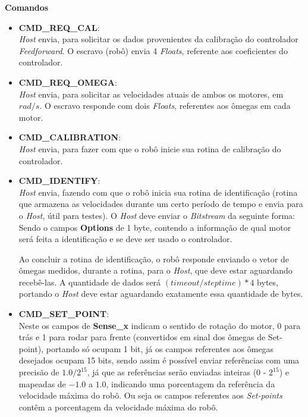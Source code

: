 \textbf{Comandos}
\begin{itemize}
    \item \textbf{CMD\_REQ\_CAL}:\\
        \textit{Host} envia, para solicitar os dados provenientes da calibração do controlador \textit{Feedforward}. O escravo (robô) envia 4 \emph{Floats}, referente aos coeficientes do controlador.
    \item \textbf{CMD\_REQ\_OMEGA}:\\
        \textit{Host} envia, para solicitar as velocidades atuais de ambos os motores, em $rad/s$. O escravo responde com dois \emph{Floats}, referentes aos ômegas em cada motor.
    \item \textbf{CMD\_CALIBRATION}:\\
        \textit{Host} envia, para fazer com que o robô inicie sua rotina de calibração do controlador.
    \item \textbf{CMD\_IDENTIFY}:\\
        \textit{Host} envia, fazendo com que o robô inicia sua rotina de identificação (rotina que armazena as velocidades durante um certo período de tempo e envia para o \emph{Host}, útil para testes). O \textit{Host} deve enviar o \emph{Bitstream} da seguinte forma:\\
        
        
        
        Sendo o campos \textbf{Options} de 1 byte, contendo a informação de qual motor será feita a identificação e se deve ser usado o controlador.
        
        Ao concluir a rotina de identificação, o robô responde enviando o vetor de ômegas medidos, durante a rotina, para o \textit{Host}, que deve estar aguardando recebê-las. A quantidade de dados será $(timeout/steptime)*4$ bytes, portando o \textit{Host} deve estar aguardando exatamente essa quantidade de bytes.
        
        
    \item \textbf{CMD\_SET\_POINT}:\\
        
        
        
        Neste os campos de \textbf{Sense\_x} indicam o sentido de rotação do motor, 0 para trás e 1 para rodar para frente (convertidos em sinal dos ômegas de Set-point), portando só ocupam 1 bit, já os campos referentes aos ômegas desejados ocupam 15 bits, sendo assim é possível enviar referências com uma precisão de $1.0/2^{15}$, já que as referências serão enviadas inteiras  (0 - $2^{15}$) e mapeadas de $-1.0$ a $1.0$, indicando uma porcentagem da referência da velocidade máxima do robô. Ou seja os campos referentes aos \textit{Set-points} contêm a porcentagem da velocidade máxima do robô.
        

\end{itemize}
